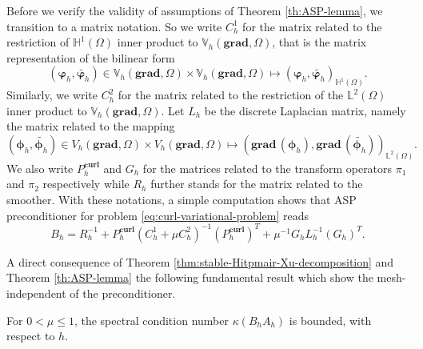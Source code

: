 Before we verify the validity of assumptions of Theorem \ref{th:ASP-lemma}, we transition to a matrix notation. So we write $C_h^1$ for the matrix related to the restriction of $\mathbb{H}^1(\Omega)$ inner product to $\mathbb{V}_h(\textbf{grad},\Omega)$, that is the matrix representation of the bilinear form 
\begin{equation*}
(\bm{\varphi}_h,\widetilde{\bm{\varphi}_h}) \in \mathbb{V}_h(\textbf{grad},\Omega) \times \mathbb{V}_h(\textbf{grad},\Omega)  \mapsto (\bm{\varphi}_h,\widetilde{\bm{\varphi}_h})_{\mathbb{H}^1(\Omega)}.
\end{equation*}
Similarly, we write $C_h^2$ for the matrix related to the restriction of the $\mathbb{L}^2(\Omega)$ inner product to $\mathbb{V}_h(\textbf{grad},\Omega)$. Let $L_h$ be the discrete Laplacian matrix, namely the matrix related to the mapping  
\begin{equation*}
(\bm{\phi}_h,\widetilde{\bm{\phi}_h}) \in V_h(\textbf{grad},\Omega) \times V_h(\textbf{grad},\Omega)  \longmapsto \left(\textbf{grad}\,(\bm{\phi}_h),\textbf{grad}\,(\widetilde{\bm{\phi}_h})\right)_{\mathbb{L}^2(\Omega)}.
\end{equation*}
We also write $P_h^{\textbf{curl}}$ and $G_h$  for the matrices related to the transform operators $\pi_1$ and $\pi_2$ respectively while $R_h$ further stands for the matrix related to the smoother. With these notations, a simple computation shows that ASP preconditioner  for problem \eqref{eq:curl-variational-problem} reads 
\begin{equation*}
B_h=R_h^{-1} + P_h^{\textbf{curl}}  \left(C_h^1+\mu C_h^2 \right)^{-1} \left( P_h^{\textbf{curl}}\right)^T + \mu^{-1} G_h L_h^{-1} \left(G_h\right)^T. 
\end{equation*}

A direct consequence of Theorem \ref{thm:stable-Hitpmair-Xu-decomposition} and Theorem \ref{th:ASP-lemma} the following fundamental result which show the mesh-independent of the preconditioner.
\begin{theorem}
For $0 < \mu \leq 1$, the spectral condition number $\kappa \left( B_h A_h\right)$ is bounded, with respect to $h$.
\end{theorem}
